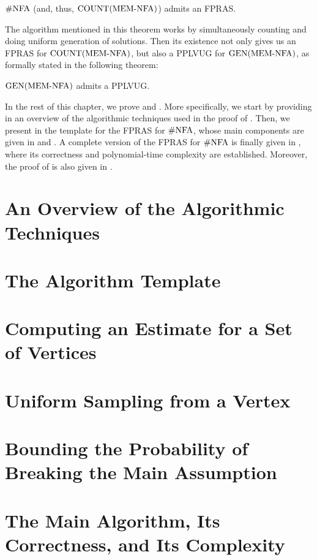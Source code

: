 \documentclass[11pt,twoside=off,numbers=noenddot]{scrbook}
\begin{document}
\begin{theorem}
    $\text{\#NFA}$ (and, thus, $\text{COUNT}(\text{MEM-NFA})$) admits an FPRAS.
\end{theorem}

The algorithm mentioned in this theorem works by simultaneously counting and doing uniform generation of solutions. Then its existence not only gives us an FPRAS for $\text{COUNT}(\text{MEM-NFA})$, but also a PPLVUG for $\text{GEN}(\text{MEM-NFA})$, as formally stated in the following theorem:

\begin{theorem}
    $\text{GEN}(\text{MEM-NFA})$ admits a PPLVUG.
\end{theorem}

In the rest of this chapter, we prove  and . More specifically, we start by providing in  an overview of the algorithmic techniques used in the proof of . Then, we present in  the template for the FPRAS for $\text{\#NFA}$, whose main components are given in  and . A complete version of the FPRAS for $\text{\#NFA}$ is finally given in , where its correctness and polynomial-time complexity are established. Moreover, the proof of  is also given in .

\section{An Overview of the Algorithmic Techniques}

\section{The Algorithm Template}

\section{Computing an Estimate for a Set of Vertices}

\section{Uniform Sampling from a Vertex}

\section{Bounding the Probability of Breaking the Main Assumption}

\section{The Main Algorithm, Its Correctness, and Its Complexity}

\printbibliography[nottype=image]
\end{document}
